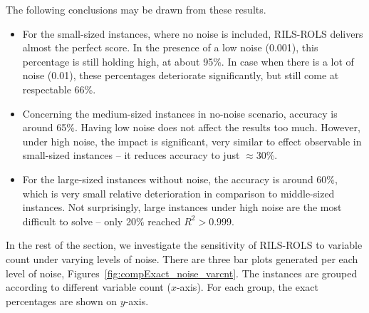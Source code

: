 \documentclass{bmcart}
\begin{document}
The following conclusions may be drawn from these results. 

\begin{itemize}
	
	\item For the small-sized instances, where no noise is included, \textsc{RILS}-\textsc{ROLS} delivers almost the perfect score. In the presence of a low noise (0.001), this percentage is still holding high, at about 95\%. In case when there is a lot of noise (0.01), these percentages deteriorate significantly, but still come at respectable 66\%. 
	
	\item Concerning  the medium-sized instances in no-noise scenario, accuracy is around 65\%. Having low noise does not affect the results too much. However, under high noise, the impact is significant, very similar to effect observable in small-sized instances -- it reduces accuracy to just $\approx$30\%.
	
	\item For the large-sized instances without noise, the accuracy is around 60\%, which is very small relative deterioration in comparison to middle-sized instances. Not surprisingly, large instances under high noise are the most difficult to solve -- only 20\% reached $R^2 > 0.999$. 
	
\end{itemize}

In the rest of the section, we investigate the sensitivity of \textsc{RILS}-\textsc{ROLS} to variable count under varying levels of noise. There are three bar plots generated per each level of noise, Figures~\ref{fig:compExact_noise_varcnt}. The instances are grouped according to different variable count ($x$-axis). For each group, the exact percentages are shown on $y$-axis.
\end{document}
